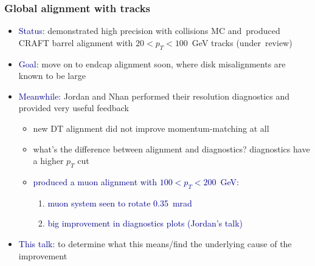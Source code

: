 \documentclass[compress]{beamer}
\begin{document}
\begin{frame}
\frametitle{Global alignment with tracks}
\begin{itemize}\setlength{\itemsep}{0.2 cm}
\item \textcolor{darkblue}{Status:} demonstrated high precision with collisions MC \mbox{and produced\hspace{-1 cm}} CRAFT barrel alignment with $20 < p_T < 100$~GeV tracks \mbox{(under review)\hspace{-1 cm}}
\item \textcolor{darkblue}{Goal:} move on to endcap alignment soon, where disk misalignments are known to be large
\item \textcolor{darkblue}{Meanwhile:} Jordan and Nhan performed their resolution diagnostics and provided very useful feedback
\begin{itemize}\setlength{\itemsep}{0.1 cm}
\item new DT alignment did not improve momentum-matching at all
\item what's the difference between alignment and diagnostics?  diagnostics have a higher $p_T$ cut
\item \textcolor{darkblue}{produced a muon alignment with $100 < p_T < 200$~GeV:}
\begin{enumerate}\setlength{\itemsep}{0.1 cm}
\item \textcolor{darkblue}{muon system seen to rotate 0.35~mrad}
\item \textcolor{darkblue}{big improvement in diagnostics plots (Jordan's talk)}
\end{enumerate}
\end{itemize}
\item \textcolor{darkblue}{This talk:} to determine what this means/find the underlying cause of the improvement
\end{itemize}
\end{frame}
\end{document}

